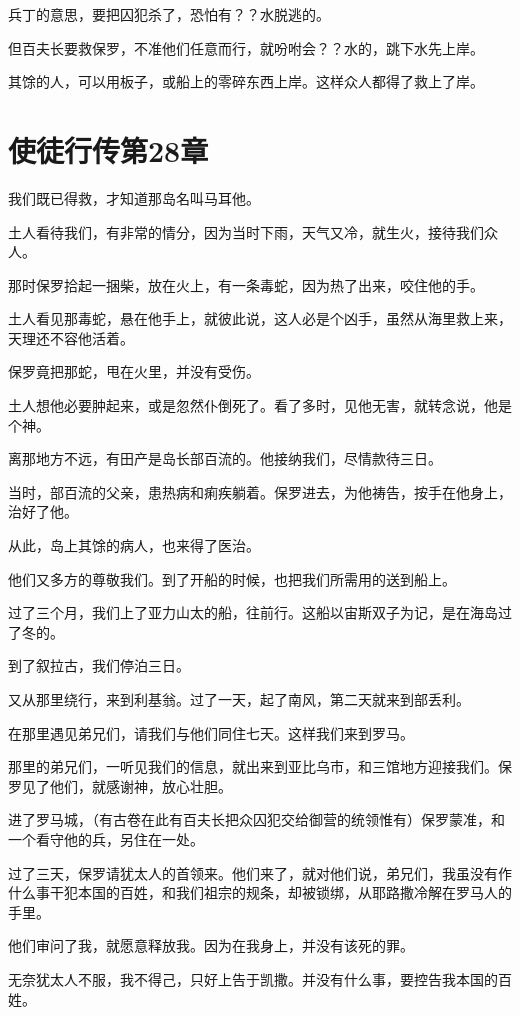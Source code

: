 \documentclass[12pt,oneside]{book}
\begin{document}
兵丁的意思，要把囚犯杀了，恐怕有？？水脱逃的。

但百夫长要救保罗，不准他们任意而行，就吩咐会？？水的，跳下水先上岸。

其馀的人，可以用板子，或船上的零碎东西上岸。这样众人都得了救上了岸。

\chapter{使徒行传第28章}
我们既已得救，才知道那岛名叫马耳他。

土人看待我们，有非常的情分，因为当时下雨，天气又冷，就生火，接待我们众人。

那时保罗拾起一捆柴，放在火上，有一条毒蛇，因为热了出来，咬住他的手。

土人看见那毒蛇，悬在他手上，就彼此说，这人必是个凶手，虽然从海里救上来，天理还不容他活着。

保罗竟把那蛇，甩在火里，并没有受伤。

土人想他必要肿起来，或是忽然仆倒死了。看了多时，见他无害，就转念说，他是个神。

离那地方不远，有田产是岛长部百流的。他接纳我们，尽情款待三日。

当时，部百流的父亲，患热病和痢疾躺着。保罗进去，为他祷告，按手在他身上，治好了他。

从此，岛上其馀的病人，也来得了医治。

他们又多方的尊敬我们。到了开船的时候，也把我们所需用的送到船上。

过了三个月，我们上了亚力山太的船，往前行。这船以宙斯双子为记，是在海岛过了冬的。

到了叙拉古，我们停泊三日。

又从那里绕行，来到利基翁。过了一天，起了南风，第二天就来到部丢利。

在那里遇见弟兄们，请我们与他们同住七天。这样我们来到罗马。

那里的弟兄们，一听见我们的信息，就出来到亚比乌市，和三馆地方迎接我们。保罗见了他们，就感谢神，放心壮胆。

进了罗马城，（有古卷在此有百夫长把众囚犯交给御营的统领惟有）保罗蒙准，和一个看守他的兵，另住在一处。

过了三天，保罗请犹太人的首领来。他们来了，就对他们说，弟兄们，我虽没有作什么事干犯本国的百姓，和我们祖宗的规条，却被锁绑，从耶路撒冷解在罗马人的手里。

他们审问了我，就愿意释放我。因为在我身上，并没有该死的罪。

无奈犹太人不服，我不得己，只好上告于凯撒。并没有什么事，要控告我本国的百姓。
\end{document}
